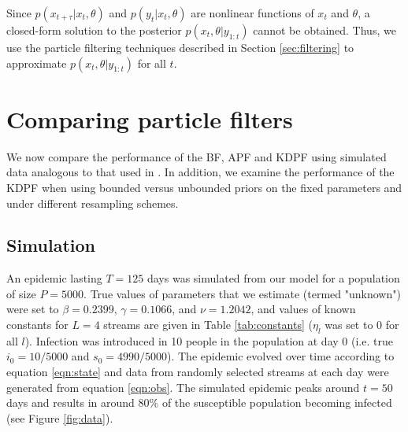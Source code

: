 \documentclass{elsarticle}
\begin{document}

Since $p(x_{t+\tau}|x_t,\theta)$ and $p(y_t|x_t,\theta)$ are nonlinear functions of $x_t$ and $\theta$, a closed-form solution to the posterior $p(x_t,\theta|y_{1:t})$ cannot be obtained. Thus, we use the particle filtering techniques described in Section \ref{sec:filtering} to approximate $p(x_t,\theta|y_{1:t})$ for all $t$.

\section{Comparing particle filters} \label{sec:results}

We now compare the performance of the BF, APF and KDPF using simulated data analogous to that used in \citep{skvortsov2012monitoring}. In addition, we examine the performance of the KDPF when using bounded versus unbounded priors on the fixed parameters and under different resampling schemes.

\subsection{Simulation}

An epidemic lasting $T = 125$ days was simulated from our model for a population of size $P = 5000$. True values of parameters that we estimate (termed "unknown") were set to $\beta = 0.2399$, $\gamma = 0.1066$, and $\nu = 1.2042$, and values of known constants for $L = 4$ streams are given in Table \ref{tab:constants} ($\eta_l$ was set to 0 for all $l$). Infection was introduced in 10 people in the population at day 0 (i.e. true $i_0 = 10/5000$ and $s_0 = 4990/5000$). The epidemic evolved over time according to equation \eqref{eqn:state} and data from randomly selected streams at each day were generated from equation \eqref{eqn:obs}. The simulated epidemic peaks around $t = 50$ days and results in around 80\% of the susceptible population becoming infected (see Figure \ref{fig:data}).
\end{document}
